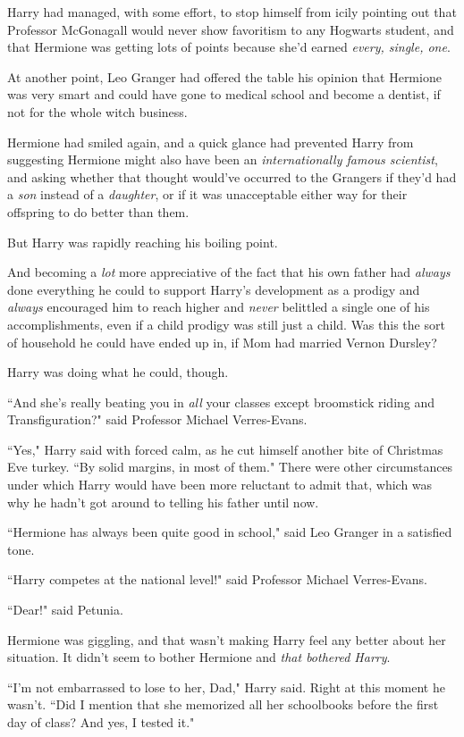 Harry had managed, with some effort, to stop himself from icily pointing out that Professor McGonagall would never show favoritism to any Hogwarts student, and that Hermione was getting lots of points because she'd earned \emph{every, single, one}.

At another point, Leo Granger had offered the table his opinion that Hermione was very smart and could have gone to medical school and become a dentist, if not for the whole witch business.

Hermione had smiled again, and a quick glance had prevented Harry from suggesting Hermione might also have been an \emph{internationally famous scientist}, and asking whether that thought would've occurred to the Grangers if they'd had a \emph{son} instead of a \emph{daughter}, or if it was unacceptable either way for their offspring to do better than them.

But Harry was rapidly reaching his boiling point.

And becoming a \emph{lot} more appreciative of the fact that his own father had \emph{always} done everything he could to support Harry's development as a prodigy and \emph{always} encouraged him to reach higher and \emph{never} belittled a single one of his accomplishments, even if a child prodigy was still just a child. Was this the sort of household he could have ended up in, if Mom had married Vernon Dursley?

Harry was doing what he could, though.

``And she's really beating you in \emph{all} your classes except broomstick riding and Transfiguration?" said Professor Michael Verres-Evans.

``Yes," Harry said with forced calm, as he cut himself another bite of Christmas Eve turkey. ``By solid margins, in most of them." There were other circumstances under which Harry would have been more reluctant to admit that, which was why he hadn't got around to telling his father until now.

``Hermione has always been quite good in school," said Leo Granger in a satisfied tone.

``Harry competes at the national level!" said Professor Michael Verres-Evans.

``Dear!" said Petunia.

Hermione was giggling, and that wasn't making Harry feel any better about her situation. It didn't seem to bother Hermione and \emph{that bothered Harry}.

``I'm not embarrassed to lose to her, Dad," Harry said. Right at this moment he wasn't. ``Did I mention that she memorized all her schoolbooks before the first day of class? And yes, I tested it."

